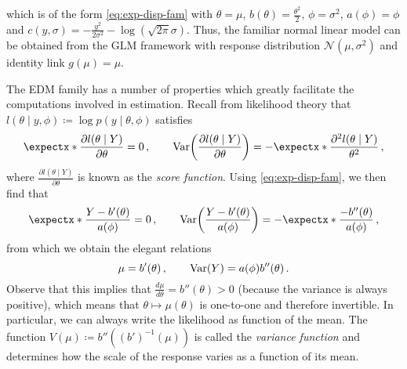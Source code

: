 \documentclass[a4paper]{book}
\begin{document}
which is of the form \cref{eq:exp-disp-fam} with $\theta = \mu$, $b(\theta) = \frac{\theta^2}{2}$, $\phi = \sigma^2$, $a(\phi) = \phi$ and $c(y, \sigma) = -\frac{y^2}{2 \sigma^2} - \log(\sqrt{2 \pi} \sigma)$. Thus, the familiar normal linear model can be obtained from the GLM framework with response distribution $\mathcal{N}(\mu, \sigma^2)$ and identity link $g(\mu) = \mu$.

The EDM family has a number of properties which greatly facilitate the computations involved in estimation. Recall from likelihood theory that $l(\theta \mid y, \phi) \coloneqq \log p(y \mid \theta, \phi)$ satisfies
\begin{equation} \label{eq:exp-var-likelihood}
  \expect{\frac{\partial l(\theta \mid Y)}{\partial \theta}} = 0 \,, \qquad \var{\frac{\partial l(\theta \mid Y)}{\partial \theta}} = -\expect{\frac{\partial^2 l(\theta \mid Y)}{\theta^2}} \,,
\end{equation}
where $\frac{\partial l(\theta \mid Y)}{\partial \theta}$ is known as the \emph{score function}. Using \cref{eq:exp-disp-fam}, we then find that
\begin{equation}
  \expect{\frac{Y - b'(\theta)}{a(\phi)}} = 0 \,, \qquad \var{\frac{Y - b'(\theta)}{a(\phi)}} = -\expect{\frac{-b''(\theta)}{a(\phi)}} \,,
\end{equation}
from which we obtain the elegant relations
\begin{equation}
  \mu = b'(\theta) \,, \qquad \var{Y} = a(\phi) b''(\theta) \,.
\end{equation}
Observe that this implies that $\frac{d \mu}{d \theta} = b''(\theta) > 0$ (because the variance is always positive), which means that $\theta \mapsto \mu(\theta)$ is one-to-one and therefore invertible. In particular, we can always write the likelihood as function of the mean. The function $V(\mu) \coloneqq b''((b')^{-1}(\mu))$ is called the \emph{variance function} and determines how the scale of the response varies as a function of its mean. 
\end{document}
